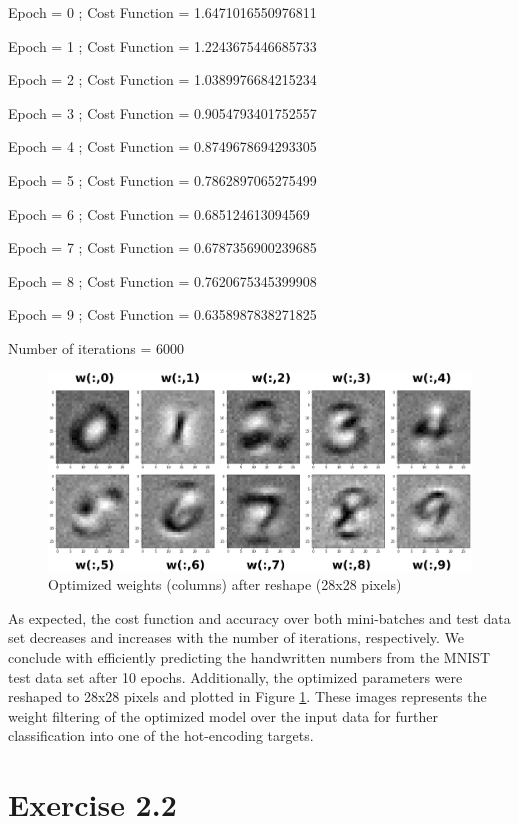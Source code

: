 \documentclass{article}
\begin{document}
Epoch = 0 ; Cost Function = 1.6471016550976811 

Epoch = 1 ; Cost Function = 1.2243675446685733 

Epoch = 2 ; Cost Function = 1.0389976684215234 

Epoch = 3 ; Cost Function = 0.9054793401752557 

Epoch = 4 ; Cost Function = 0.8749678694293305 

Epoch = 5 ; Cost Function = 0.7862897065275499 

Epoch = 6 ; Cost Function = 0.685124613094569 

Epoch = 7 ; Cost Function = 0.6787356900239685 

Epoch = 8 ; Cost Function = 0.7620675345399908 

Epoch = 9 ; Cost Function = 0.6358987838271825 

Number of iterations =  6000

\begin{figure}[t]
     \centering
     \includegraphics[width=1\linewidth]{weight}
     \caption{Optimized weights (columns) after reshape (28x28 pixels)}
     \label{fig:figuree}
\end{figure}

As expected, the cost function and accuracy over both mini-batches and test data set decreases and increases with the number of iterations, respectively. We conclude with efficiently predicting the handwritten numbers from the MNIST test data set after 10 epochs. Additionally, the optimized parameters were reshaped to 28x28 pixels and plotted in Figure \ref{fig:figuree}. These images represents the weight filtering of the optimized model over the input data for further classification into one of the hot-encoding targets. 

\section{Exercise 2.2}
\end{document}
